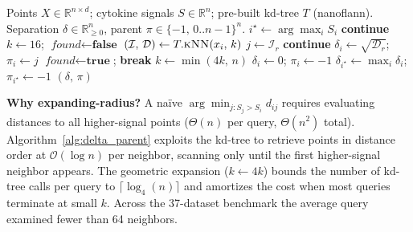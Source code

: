 \begin{algorithm}[t]
\caption{\textsc{DeltaParent\_KdTree} — kd-tree-backed nearest higher-signal search}
\label{alg:delta_parent}
\begin{algorithmic}[1]
\Require Points $X \in \mathbb{R}^{n\times d}$; cytokine signals $S \in \mathbb{R}^n$; pre-built kd-tree $T$ (nanoflann).
\Ensure  Separation $\delta \in \mathbb{R}_{\ge 0}^n$, parent $\pi \in \{-1,\,0..n{-}1\}^n$.
\State $i^{\star} \gets \arg\max_i S_i$ 
     \State \textbf{continue} \EndIf
    \State $k \gets 16$;\; $\textit{found} \gets \textbf{false}$
        \State $(\mathcal{I},\,\mathcal{D}) \gets T.\textsc{kNN}(x_i,\,k)$ 
            \State $j \gets \mathcal{I}_r$
             \State \textbf{continue} \EndIf
                \State $\delta_i \gets \sqrt{\mathcal{D}_r}$;\; $\pi_i \gets j$
                \State $\textit{found} \gets \textbf{true}$;\; \textbf{break}
            \EndIf
        \EndFor
         \State $k \gets \min(4k,\,n)$ 
        \EndIf
    \EndWhile
     \State $\delta_i \gets 0$;\; $\pi_i \gets -1$ \EndIf
\EndFor
\State $\delta_{i^{\star}} \gets \max_i \delta_i$;\; $\pi_{i^{\star}} \gets -1$
\State \Return $(\delta,\,\pi)$
\end{algorithmic}
\end{algorithm}

\noindent\textbf{Why expanding-radius?}\;
A naïve $\arg\min_{j: S_j > S_i} d_{ij}$ requires evaluating distances to
all higher-signal points ($\Theta(n)$ per query, $\Theta(n^2)$ total).
Algorithm~\ref{alg:delta_parent} exploits the kd-tree to retrieve points
in distance order at $\mathcal{O}(\log n)$ per neighbor, scanning only
until the first higher-signal neighbor appears. The geometric expansion
($k\!\leftarrow\!4k$) bounds the number of kd-tree calls per query to
$\lceil \log_4(n) \rceil$ and amortizes the cost when most queries
terminate at small $k$. Across the 37-dataset benchmark the average
query examined fewer than 64 neighbors.


